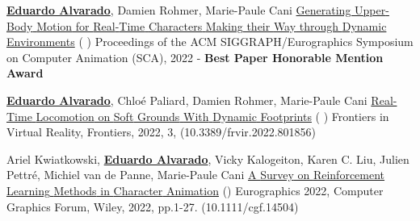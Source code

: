 

\begin{cventries}

\cvpublication
    {\textbf{\underline{Eduardo Alvarado}}, Damien Rohmer, Marie-Paule Cani} %
    {\href{https://edualvarado.com/generating-upper-body-motion/} {Generating {Upper}-{Body} {Motion} for {Real}-{Time} {Characters} {Making} their {Way} through {Dynamic} {Environments}} (\href{https://github.com/edualvarado/unity-antagonistic-controller}{} \href{https://hal.inria.fr/hal-03757439v1}{} \href{https://www.youtube.com/watch?v=dq4FJH1atWM}{})} %
    {Proceedings of the ACM SIGGRAPH/Eurographics Symposium on Computer Animation (SCA), 2022 - \textbf{Best Paper Honorable Mention Award}} %
    
\cvpublication
    {\textbf{\underline{Eduardo Alvarado}}, Chloé Paliard, Damien Rohmer, Marie-Paule Cani} %
    {\href{https://edualvarado.com/real-time-locomotion-on-soft-grounds/}{Real-{Time} {Locomotion} on {Soft} {Grounds} {With} {Dynamic} {Footprints}} (\href{https://github.com/edualvarado/unity-footprints}{} \href{https://hal.inria.fr/hal-03630136}{} \href{https://youtu.be/aWBntnCOwEE}{})} %
    {Frontiers in Virtual Reality, Frontiers, 2022, 3, (10.3389/frvir.2022.801856)} %

\cvpublication
    {Ariel Kwiatkowski, \textbf{\underline{Eduardo Alvarado}}, Vicky Kalogeiton, Karen C. Liu, Julien Pettr{\'{e}}, Michiel van de Panne, Marie-Paule Cani} %
    {\href{https://edualvarado.com/survey-rl-character-animation/}{A {Survey} on {Reinforcement} {Learning} {Methods} in {Character} {Animation}} (\href{https://hal.inria.fr/hal-03600947}{})} %
    {Eurographics 2022, Computer Graphics Forum, Wiley, 2022, pp.1-27. (10.1111/cgf.14504)} %


\end{cventries}
